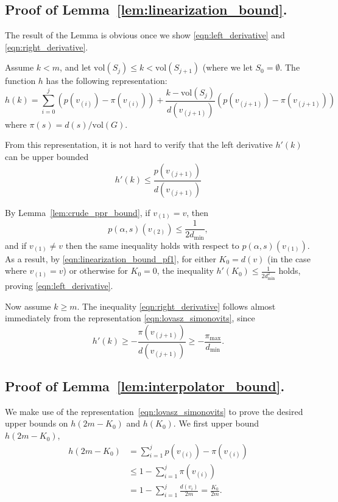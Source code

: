 \documentclass{article}
\newcommand{\vol}{\mathrm{vol}}
\newcommand{\1}{\mathbf{1}}
\theoremstyle{alden}
\theoremstyle{aldenthm}
\theoremstyle{remark}
\begin{document}
\subsection{Proof of Lemma~\ref{lem:linearization_bound}.}
The result of the Lemma is obvious once we show \eqref{eqn:left_derivative} and \eqref{eqn:right_derivative}. 

Assume $k < m$, and let $\vol(S_j) \leq k < \vol(S_{j + 1})$ (where we let $S_0 = \emptyset$. The function $h$ has the following representation:
\begin{equation}
\label{eqn:lovasz_simonovits}
h(k) = \sum_{i = 0}^{j} \left(p(v_{(i)}) - \pi(v_{(i)})\right) + \frac{k - \vol(S_j)}{d(v_{(j + 1)})} \left(p(v_{(j+1)}) - \pi(v_{(j+1)})\right) 
\end{equation}
where $\pi(s) = d(s)/\vol(G)$. 

From this representation, it is not hard to verify that the left derivative $h'(k)$ can be upper bounded
\begin{equation}
\label{eqn:linearization_bound_pf1}
h'(k) \leq \frac{p(v_{(j + 1)})}{d(v_{(j + 1)})}
\end{equation}

By Lemma~\ref{lem:crude_ppr_bound}, if $v_{(1)} = v$, then
\begin{equation*}
p(\alpha,s)(v_{(2)}) \leq \frac{1}{2d_{\min}},
\end{equation*}
and if $v_{(1)} \neq v$ then the same inequality holds with respect to $p(\alpha,s)(v_{(1)})$. 
As a result, by \eqref{eqn:linearization_bound_pf1}, for either $K_0 = d(v)$ (in the case where $v_{(1)} = v$) or otherwise for $K_0 = 0$, the inequality $h'(K_0) \leq \frac{1}{2d_{\min}^2}$ holds, proving \eqref{eqn:left_derivative}.

Now assume $k \geq m$. The inequality \eqref{eqn:right_derivative} follows almost immediately from the representation \eqref{eqn:lovasz_simonovits}, since
\begin{equation*}
h'(k) \geq -\frac{\pi(v_{(j+1)})}{d(v_{(j + 1)})} \geq -\frac{\pi_{\max}}{d_{\min}}.
\end{equation*}

\subsection{Proof of Lemma~\ref{lem:interpolator_bound}.}
We make use of the representation~\ref{eqn:lovasz_simonovits} to prove the desired upper bounds on $h(2m - K_0)$ and $h(K_0)$. We first upper bound $h(2m - K_0)$,
\begin{align*}
h(2m - K_0) & = \sum_{i = 1}^{j} p(v_{(i)}) - \pi(v_{(i)}) \\
& \leq 1 - \sum_{i = 1}^{j} \pi(v_{(i)}) \\
& = 1 - \sum_{i = 1}^{j} \frac{d(v_{i})}{2m} = \frac{K_0}{2m}.
\end{align*}
\end{document}
